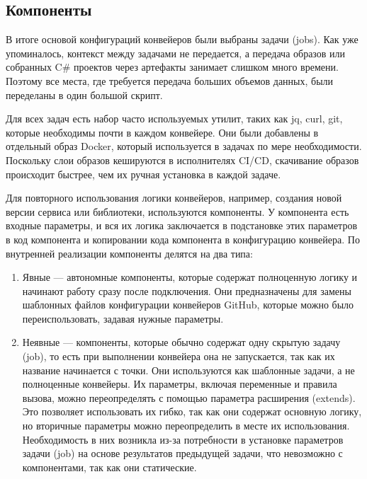 \subsection{Компоненты} \label{subsec:components}
В итоге основой конфигураций конвейеров были выбраны задачи (jobs).
Как уже упоминалось, контекст между задачами не передается, а передача образов или собранных C\# проектов через артефакты занимает слишком много времени.
Поэтому все места, где требуется передача больших объемов данных, были переделаны в один большой скрипт.

Для всех задач есть набор часто используемых утилит, таких как jq, curl, git, которые необходимы почти в каждом конвейере.
Они были добавлены в отдельный образ Docker, который используется в задачах по мере необходимости.
Поскольку слои образов кешируются в исполнителях CI/CD, скачивание образов происходит быстрее, чем их ручная установка в каждой задаче.

Для повторного использования логики конвейеров, например, создания новой версии сервиса или библиотеки, используются компоненты.
У компонента есть входные параметры, и вся их логика заключается в подстановке этих параметров в код компонента и копировании кода компонента в конфигурацию конвейера.
По внутренней реализации компоненты делятся на два типа:
\begin{enumerate}
  \item Явные --- автономные компоненты, которые содержат полноценную логику и начинают работу сразу после подключения.
        Они предназначены для замены шаблонных файлов конфигурации конвейеров GitHub, которые можно было переиспользовать, задавая нужные параметры.
  \item Неявные --- компоненты, которые обычно содержат одну скрытую задачу (job), то есть при выполнении конвейера она не запускается, так как их название начинается с точки.
        Они используются как шаблонные задачи, а не полноценные конвейеры.
        Их параметры, включая переменные и правила вызова, можно переопределять с помощью параметра расширения (extends).
        Это позволяет использовать их гибко, так как они содержат основную логику, но вторичные параметры можно переопределить в месте их использования.
        Необходимость в них возникла из-за потребности в установке параметров задачи (job) на основе результатов предыдущей задачи, что невозможно с компонентами, так как они статические.
\end{enumerate}


